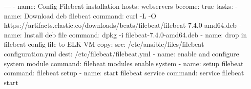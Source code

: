 ---
- name: Config Filebeat installation
  hosts: webservers
  become: true
  tasks:
  - name: Download deb filebeat
    command: curl -L -O https://artifacts.elastic.co/downloads/beats/filebeat/filebeat-7.4.0-amd64.deb
  - name: Install deb file
    command: dpkg -i filebeat-7.4.0-amd64.deb
  - name: drop in filebeat config file to ELK VM
    copy:
      src: /etc/ansible/files/filebeat-configuration.yml
      dest: /etc/filebeat/filebeat.yml
  - name: enable and configure system module
    command: filebeat modules enable system
  - name: setup filebeat
    command: filebeat setup
  - name: start filebeat service
    command: service filebeat start
